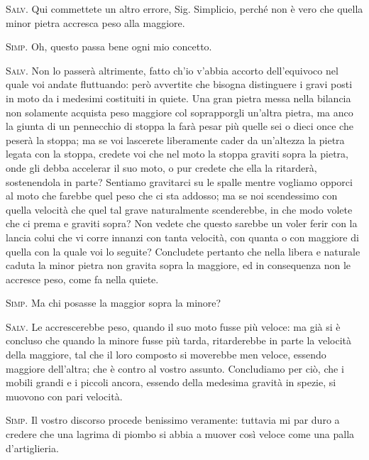 \documentclass[11pt,twoside,openany]{book}
\newcommand{\speaker}[1]{\textcolor{rubric}{\textsc{#1}}\space}
\begin{document}
\speaker{Salv.} Qui commettete un altro errore, Sig. Simplicio, perché non è vero che quella minor pietra accresca peso alla maggiore.

\speaker{Simp.} Oh, questo passa bene ogni mio concetto.

\speaker{Salv.} Non lo passerà altrimente, fatto ch'io v'abbia accorto dell'equivoco nel quale voi andate fluttuando: però avvertite che bisogna distinguere i gravi posti in moto da i medesimi costituiti in quiete. Una gran pietra messa nella bilancia non solamente acquista peso maggiore col soprapporgli un'altra pietra, ma anco la giunta di un pennecchio di stoppa la farà pesar più quelle sei o dieci once che peserà la stoppa; ma se voi lascerete liberamente cader da un'altezza la pietra legata con la stoppa, credete voi che nel moto la stoppa graviti sopra la pietra, onde gli debba accelerar il suo moto, o pur credete che ella la ritarderà, sostenendola in parte? Sentiamo gravitarci su le spalle mentre vogliamo opporci al moto che farebbe quel peso che ci sta addosso; ma se noi scendessimo con quella velocità che quel tal grave naturalmente scenderebbe, in che modo volete che ci prema e graviti sopra? Non vedete che questo sarebbe un voler ferir con la lancia colui che vi corre innanzi con tanta velocità, con quanta o con maggiore di quella con la quale voi lo seguite? Concludete pertanto che nella libera e naturale caduta la minor pietra non gravita sopra la maggiore, ed in consequenza non le accresce peso, come fa nella quiete.

\speaker{Simp.} Ma chi posasse la maggior sopra la minore?

\speaker{Salv.} Le accrescerebbe peso, quando il suo moto fusse più veloce: ma già si è concluso che quando la minore fusse più tarda, ritarderebbe in parte la velocità della maggiore, tal che il loro composto si moverebbe men veloce, essendo maggiore dell'altra; che è contro al vostro assunto. Concludiamo per ciò, che i mobili grandi e i piccoli ancora, essendo della medesima gravità in spezie, si muovono con pari velocità.

\speaker{Simp.} Il vostro discorso procede benissimo veramente: tuttavia mi par duro a credere che una lagrima di piombo si abbia a muover così veloce come una palla d'artiglieria.
\end{document}
